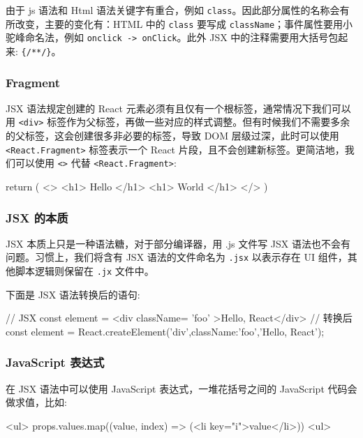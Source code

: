 由于 js 语法和 Html 语法关键字有重合，例如 \texttt{class}。因此部分属性的名称会有所改变，主要的变化有：HTML 中的 \texttt{class} 要写成 \texttt{className}；事件属性要用小驼峰命名法，例如 \texttt{onclick -> onClick}。此外 JSX 中的注释需要用大括号包起来: \texttt{\{/**/\}}。

\subsubsection*{Fragment}

JSX 语法规定创建的 React 元素必须有且仅有一个根标签，通常情况下我们可以用 \texttt{<div>} 标签作为父标签，再做一些对应的样式调整。但有时候我们不需要多余的父标签，这会创建很多非必要的标签，导致 DOM 层级过深，此时可以使用 \texttt{<React.Fragment>} 标签表示一个 React 片段，且不会创建新标签。更简洁地，我们可以使用 \texttt{<>} 代替 \texttt{<React.Fragment>}:

\begin{JavaScript}
return (
    <>
        <h1> Hello </h1>
        <h1> World </h1>
    </>
)
\end{JavaScript}
 

\subsubsection*{JSX 的本质}

JSX 本质上只是一种语法糖，对于部分编译器，用 .js 文件写 JSX 语法也不会有问题。习惯上，我们将含有 JSX 语法的文件命名为 \texttt{.jsx} 以表示存在 UI 组件，其他脚本逻辑则保留在 \texttt{.jx} 文件中。

下面是 JSX 语法转换后的语句:

\begin{JavaScript}
// JSX
const element = <div className= 'foo' >Hello, React</div> 
// 转换后
const element = React.createElement('div',{className:'foo'},'Hello, React'); 
\end{JavaScript}

\subsubsection*{JavaScript 表达式}

在 JSX 语法中可以使用 JavaScript 表达式，一堆花括号之间的 JavaScript 代码会做求值，比如:

\begin{JavaScript}
<ul>
    {props.values.map((value, index) => (<li key="{i}">{value}</li>))}
<ul>
\end{JavaScript}







\newpage